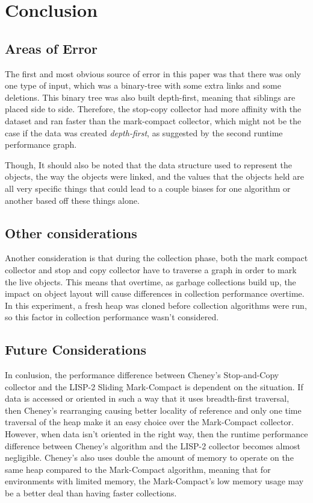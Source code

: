 \documentclass[index]{subfiles}
\begin{document}
\section{Conclusion}

\subsection{Areas of Error}

The first and most obvious source of error in this paper was that there was only one type of input, which was a binary-tree with some extra links and some deletions. This binary tree was also built depth-first, meaning that siblings are placed side to side. Therefore, the stop-copy collector had more affinity with the dataset and ran faster than the mark-compact collector, which might not be the case if the data was created \textit{depth-first}, as suggested by the second runtime performance graph.

Though, It should also be noted that the data structure used to represent the objects, the way the objects were linked, and the values that the objects held are all very specific things that could lead to a couple biases for one algorithm or another based off these things alone.

\subsection{Other considerations}

Another consideration is that during the collection phase, both the mark compact collector and stop and copy collector have to traverse a graph in order to mark the live objects. This means that overtime, as garbage collections build up, the impact on object layout will cause differences in collection performance overtime. In this experiment, a fresh heap was cloned before collection algorithms were run, so this factor in collection performance wasn't considered.

\subsection{Future Considerations}

In conlusion, the performance difference between Cheney's Stop-and-Copy collector and the LISP-2 Sliding Mark-Compact is dependent on the situation. If data is accessed or oriented in such a way that it uses breadth-first traversal, then Cheney's rearranging causing better locality of reference and only one time traversal of the heap make it an easy choice over the Mark-Compact collector. However, when data isn't oriented in the right way, then the runtime performance difference between Cheney's algorithm and the LISP-2 collector becomes almost negligible. Cheney's also uses double the amount of memory to operate on the same heap compared to the Mark-Compact algorithm, meaning that for environments with limited memory, the Mark-Compact's low memory usage may be a better deal than having faster collections.
\end{document}
